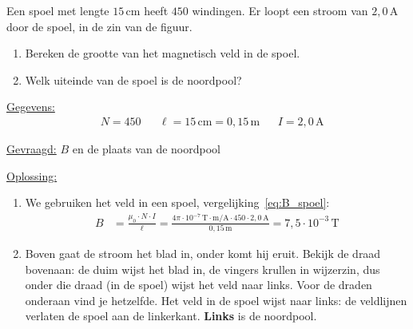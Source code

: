 \documentclass{ximera}
\begin{document}
\begin{example}[foldable=true,title={Veld in een spoel}]\nl
    Een spoel met lengte $15\,\mathrm{cm}$ heeft $450$ windingen. Er loopt een stroom van $2{,}0\,\mathrm{A}$ door de spoel, in de zin van de figuur.
    \begin{enumerate}
        \item Bereken de grootte van het magnetisch veld in de spoel.
        \item Welk uiteinde van de spoel is de noordpool?
    \end{enumerate}

    \begin{center}
    \end{center}

    \begin{solution}\nl
        \underline{Gegevens:}
        \begin{align*}
            & N = 450 & & \ell = 15\,\mathrm{cm} = 0{,}15\,\mathrm{m} & & I = 2{,}0\,\mathrm{A}
        \end{align*}

        \underline{Gevraagd:} $B$ en de plaats van de noordpool

        \underline{Oplossing:}
        \begin{enumerate}
            \item We gebruiken het veld in een spoel, vergelijking~\eqref{eq:B_spoel}:
            \begin{align*}
                B &= \frac{\mu_0 \cdot N \cdot I}{\ell} = \frac{4\pi \cdot 10^{-7}\,\mathrm{T\cdot m/A} \cdot 450 \cdot 2{,}0\,\mathrm{A}}{0{,}15\,\mathrm{m}} = \boxed{7{,}5 \cdot 10^{-3}\,\mathrm{T}}
            \end{align*}
            \item Boven gaat de stroom het blad in, onder komt hij eruit. Bekijk de draad bovenaan: de duim wijst het blad in, de vingers krullen in wijzerzin, dus onder die draad (in de spoel) wijst het veld naar links. Voor de draden onderaan vind je hetzelfde. Het veld in de spoel wijst naar links: de veldlijnen verlaten de spoel aan de linkerkant. \textbf{Links} is de noordpool.
        \end{enumerate}
    \end{solution}
\end{example}
\end{document}
